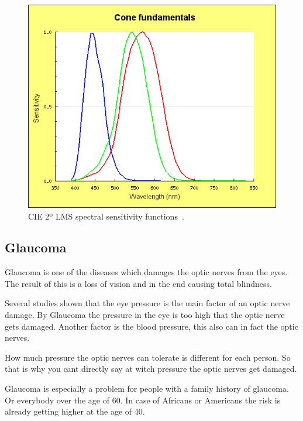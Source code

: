 \documentclass{sig-alternate-05-2015}
\begin{document}

\begin{figure}
    \includegraphics[width=\columnwidth]{lms-sensitivity.png}
    \caption{CIE 2º LMS spectral sensitivity functions~\cite{cvrl-lms-web}.}
    \label{fig:lmscurves}
\end{figure}

\subsection{Glaucoma}

Glaucoma is one of the diseases which damages the optic nerves from the eyes. The result of this is a loss of vision and in the end causing total blindness. 

Several studies shown that the eye pressure is the main factor of an optic nerve damage. By Glaucoma the pressure in the eye is too high that the optic nerve gets damaged. Another factor is the blood pressure, this also can in fact the optic nerves.

How much pressure the optic nerves can tolerate is different for each person. So that is why you cant directly say at witch pressure the optic nerves get damaged.

Glaucoma is especially a problem for people with a family history of glaucoma. Or everybody over the age of 60. In case of Africans or Americans the risk is already getting higher at the age of 40.
\end{document}
